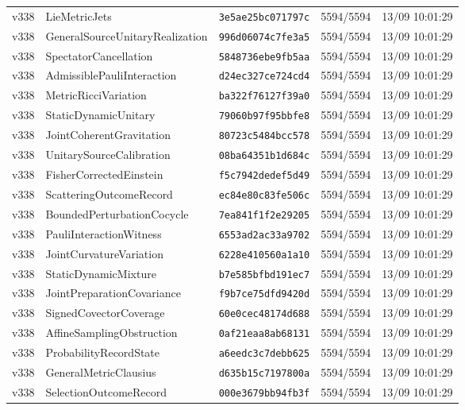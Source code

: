 \documentclass[11pt]{article}
\theoremstyle{definition}\newtheorem{deriv}{Derivation}
\begin{document}
{\begin{longtable}{@{}lllll@{}}
v338 & LieMetricJets & \texttt{3e5ae25bc071797c} & 5594/5594 & 13/09 10:01:29 \\
v338 & GeneralSourceUnitaryRealization & \texttt{996d06074c7fe3a5} & 5594/5594 & 13/09 10:01:29 \\
v338 & SpectatorCancellation & \texttt{5848736ebe9fb5aa} & 5594/5594 & 13/09 10:01:29 \\
v338 & AdmissiblePauliInteraction & \texttt{d24ec327ce724cd4} & 5594/5594 & 13/09 10:01:29 \\
v338 & MetricRicciVariation & \texttt{ba322f76127f39a0} & 5594/5594 & 13/09 10:01:29 \\
v338 & StaticDynamicUnitary & \texttt{79060b97f95bbfe8} & 5594/5594 & 13/09 10:01:29 \\
v338 & JointCoherentGravitation & \texttt{80723c5484bcc578} & 5594/5594 & 13/09 10:01:29 \\
v338 & UnitarySourceCalibration & \texttt{08ba64351b1d684c} & 5594/5594 & 13/09 10:01:29 \\
v338 & FisherCorrectedEinstein & \texttt{f5c7942dedef5d49} & 5594/5594 & 13/09 10:01:29 \\
v338 & ScatteringOutcomeRecord & \texttt{ec84e80c83fe506c} & 5594/5594 & 13/09 10:01:29 \\
v338 & BoundedPerturbationCocycle & \texttt{7ea841f1f2e29205} & 5594/5594 & 13/09 10:01:29 \\
v338 & PauliInteractionWitness & \texttt{6553ad2ac33a9702} & 5594/5594 & 13/09 10:01:29 \\
v338 & JointCurvatureVariation & \texttt{6228e410560a1a10} & 5594/5594 & 13/09 10:01:29 \\
v338 & StaticDynamicMixture & \texttt{b7e585bfbd191ec7} & 5594/5594 & 13/09 10:01:29 \\
v338 & JointPreparationCovariance & \texttt{f9b7ce75dfd9420d} & 5594/5594 & 13/09 10:01:29 \\
v338 & SignedCovectorCoverage & \texttt{60e0cec48174d688} & 5594/5594 & 13/09 10:01:29 \\
v338 & AffineSamplingObstruction & \texttt{0af21eaa8ab68131} & 5594/5594 & 13/09 10:01:29 \\
v338 & ProbabilityRecordState & \texttt{a6eedc3c7debb625} & 5594/5594 & 13/09 10:01:29 \\
v338 & GeneralMetricClausius & \texttt{d635b15c7197800a} & 5594/5594 & 13/09 10:01:29 \\
v338 & SelectionOutcomeRecord & \texttt{000e3679bb94fb3f} & 5594/5594 & 13/09 10:01:29 \\

\end{longtable}}
\end{document}
